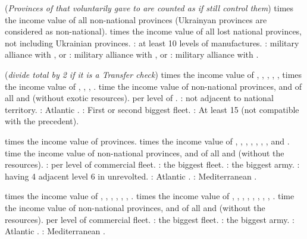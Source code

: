 \bparag ({\it Provinces of  that 
  voluntarily gave to  are counted as if
   still control them})
 times the income value of all non-national provinces (Ukrainyan
provinces are considered as non-national).
 times the income value of all lost national provinces, not
including Ukrainian provinces.
 \VPs: at least 10 levels of manufactures.
 \VPs: military alliance with , or
 \VPs: military alliance with , or
 \VPs: military alliance with .

\bparag ({\it divide total by 2 if it is a Transfer check})
 times the income value of ,
, , ,
, 
 times the income value of ,
, , .
 time the income value of non-national provinces, and of all \COL and
\TP (without exotic resources).
 \VP per level of .
 \VPs: \FRA not adjacent to national territory.
 \VPs: Atlantic .
 \VPs: First or second biggest fleet.
 \VPs: At least 15 \NWD (not compatible with the precedent).

 times the income value of  provinces.
 times the income value of ,
, , ,
, , ,
and .
 time the income value of non-national provinces, and of all \COL and
\TP (without the resources).
 \VPs: 
 \VP per level of commercial fleet.
 \VPs: the biggest fleet.
 \VPs: the biggest army.
 \VPs: having 4 adjacent level 6 \COL in 
unrevolted.
 \VPs: Atlantic .
 \VPs: Mediterranean .

 times the income value of ,
, , ,
, , .
 times the income value of ,
, , ,
, ,
, ,
.
 time the income value of non-national provinces, and of all \COL and
\TP (without the resources).
 \VP per level of commercial fleet.
 \VPs: the biggest fleet.
 \VPs: the biggest army.
 \VPs: Atlantic .
 \VPs: Mediterranean .

